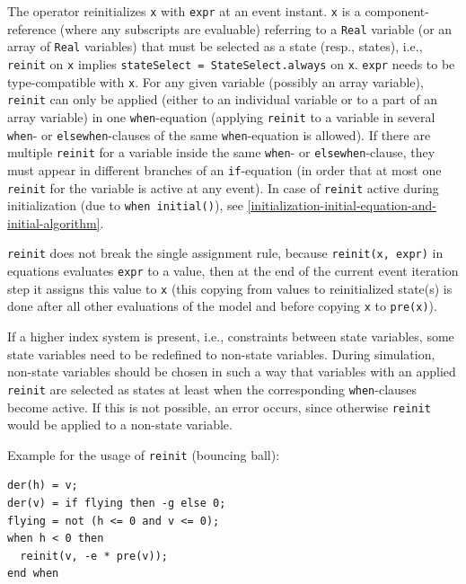 The operator reinitializes \lstinline!x! with \lstinline!expr! at an event instant.
\lstinline!x! is a component-reference (where any subscripts are evaluable) referring to a \lstinline!Real! variable (or an array of \lstinline!Real! variables) that must be selected as a state (resp., states), i.e., \lstinline!reinit! on \lstinline!x! implies \lstinline!stateSelect = StateSelect.always! on \lstinline!x!.
\lstinline!expr! needs to be type-compatible with \lstinline!x!.
For any given variable (possibly an array variable), \lstinline!reinit! can only be applied (either to an individual variable or to a part of an array variable) in one \lstinline!when!-equation (applying \lstinline!reinit! to a variable in several \lstinline!when!- or \lstinline!elsewhen!-clauses of the same \lstinline!when!-equation is allowed).
If there are multiple \lstinline!reinit! for a variable inside the same \lstinline!when!- or \lstinline!elsewhen!-clause, they must appear in different branches of an \lstinline!if!-equation (in order that at most one \lstinline!reinit! for the variable is active at any event).
In case of \lstinline!reinit! active during initialization (due to \lstinline!when initial()!), see \cref{initialization-initial-equation-and-initial-algorithm}.

\lstinline!reinit! does not break the single assignment rule, because \lstinline!reinit(x, expr)! in equations evaluates \lstinline!expr! to a value, then at the end of the current event iteration step it assigns this value to \lstinline!x! (this copying from values to reinitialized state(s) is done after all other evaluations of the model and before copying \lstinline!x! to \lstinline!pre(x)!).

\begin{example}
If a higher index system is present, i.e., constraints between state variables, some state variables need to be redefined to non-state variables.
During simulation, non-state variables should be chosen in such a way that variables with an applied \lstinline!reinit! are selected as states at least when the corresponding \lstinline!when!-clauses become active.
If this is not possible, an error occurs, since otherwise \lstinline!reinit! would be applied to a non-state variable.

Example for the usage of \lstinline!reinit! (bouncing ball):
\begin{lstlisting}[language=modelica]
der(h) = v;
der(v) = if flying then -g else 0;
flying = not (h <= 0 and v <= 0);
when h < 0 then
  reinit(v, -e * pre(v));
end when
\end{lstlisting}
\end{example}



